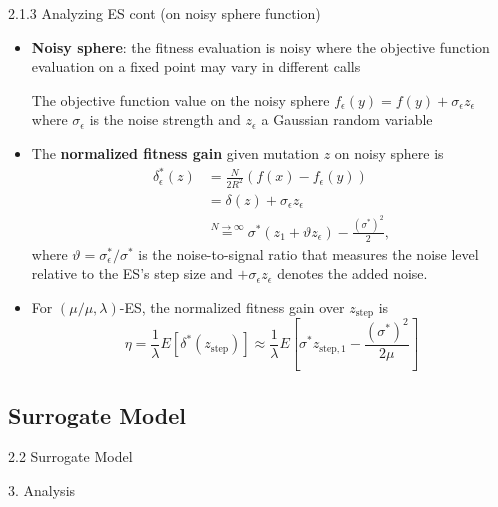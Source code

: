 \documentclass{beamer}
\begin{document}
\begin{frame}{2.1.3 Analyzing ES cont (on noisy sphere function)}
\begin{itemize}
    \item \textbf{Noisy sphere}: the fitness evaluation is noisy where the objective function evaluation on a fixed point may vary in different calls
    
    The objective function value on the noisy sphere $f_{\epsilon}(y) = f(y) + \sigma_{\epsilon} z_\epsilon$ where $\sigma_\epsilon$ is the noise strength and $z_\epsilon$ a Gaussian random variable
    \item The \textbf{normalized fitness gain} given mutation $z$ on noisy sphere is 
    \begin{align}
        \delta_\epsilon^* (z)
        &=  \frac{N}{2R^2}\left( f(x) - f_\epsilon(y)\right)  \nonumber\\ 
        & = \delta(z) + \sigma_\epsilon z_\epsilon\nonumber\\
        &\overset{N \rightarrow \infty}{=} \sigma^* (z_1 + \vartheta z_\epsilon ) - \frac{(\sigma^*)^2}{2}, \nonumber
    \end{align}
    where $\vartheta = \sigma_\epsilon^*/\sigma^*$ is the noise-to-signal ratio that measures the noise level relative to the ES's step size and $+\sigma_\epsilon z_\epsilon$ denotes the added noise.
    \item For $(\mu/\mu,\lambda)$-ES, the normalized fitness gain over $z_{\text{step}}$ is
    $$\eta = \frac{1}{\lambda}E[ \delta^*(z_{\text{step}})] \approx \frac{1}{\lambda} E \left[ \sigma^* z_{\text{step},1}  - \frac{(\sigma^*)^2}{2\mu}  \right]$$
\end{itemize}
\end{frame}

\subsection{Surrogate Model}

\begin{frame}{2.2 Surrogate Model}


\end{frame}


\begin{frame}[plain,c]
\begin{center}
\Huge 3. Analysis
\end{center}
\end{frame}
\end{document}

